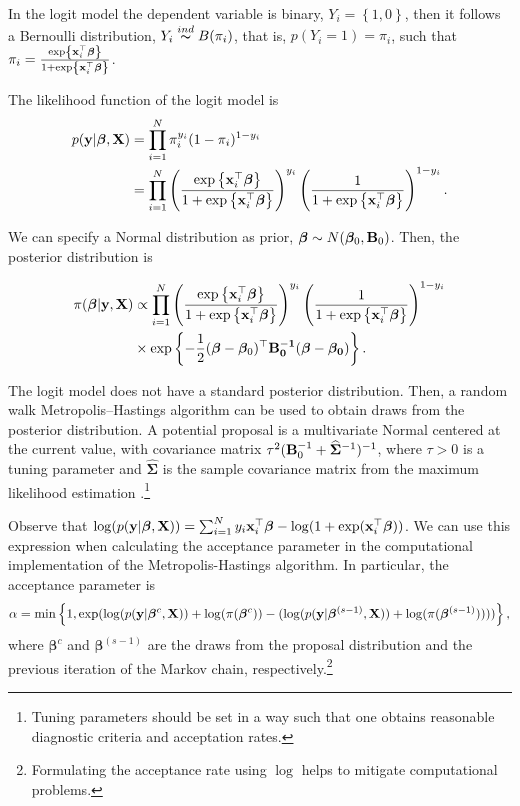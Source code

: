 In the logit model the dependent variable is binary, $Y_i=\left\{1,0\right\}$, then it follows a Bernoulli distribution, $Y_i\stackrel{ind} {\thicksim}B(\pi_i)$, that is, $p(Y_i=1)=\pi_i$, such that $\pi_i=\frac{\exp\left\{{\bf{x}}_i^{\top}\bm{\beta}\right\}}{1+\exp\left\{{\bf{x}}_i^{\top}\bm{\beta}\right\}}$.

The likelihood function of the logit model is
\begin{align*}
	p({\bf{y}}|\bm{\beta},{\bf{X}})&=\prod_{i=1}^N \pi_i^{y_i}(1-\pi_i)^{1-y_i}\\
	&=\prod_{i=1}^N\left(\frac{\exp\left\{{\bf{x}}_i^{\top}\bm{\beta}\right\}}{1+\exp\left\{{\bf{x}}_i^{\top}\bm{\beta}\right\}}\right)^{y_i}\left(\frac{1}{1+\exp\left\{{\bf{x}}_i^{\top}\bm{\beta}\right\}}\right)^{1-y_i}.
\end{align*}

We can specify a Normal distribution as prior, $\bm{\beta}\sim N({\bm{\beta}}_0,{\bf{B}}_0)$. Then, the posterior distribution is

\begin{align*}
	\pi(\bm{\beta}|{\bf{y}},{\bf{X}})&\propto\prod_{i=1}^N\left(\frac{\exp\left\{{\bf{x}}_i^{\top}\bm{\beta}\right\}}{1+\exp\left\{{\bf{x}}_i^{\top}\bm{\beta}\right\}}\right)^{y_i}\left(\frac{1}{1+\exp\left\{{\bf{x}}_i^{\top}\bm{\beta}\right\}}\right)^{1-y_i}\\
	&\times\exp\left\{-\frac{1}{2}(\bm{\beta}-\bm{\beta}_0)^{\top}\bf{B}_0^{-1}(\bm{\beta}-\bm{\beta}_0)\right\}.
\end{align*}

The logit model does not have a standard posterior distribution. Then, a random walk Metropolis--Hastings algorithm can be used to obtain draws from the posterior distribution. A potential proposal is a multivariate Normal centered at the current value, with covariance matrix $\tau^2({\bf{B}}_0^{-1}+\widehat{{\bm{\Sigma}}}^{-1})^{-1}$, where $\tau>0$ is a tuning parameter and $\widehat{\bm{\Sigma}}$ is the sample covariance matrix from the maximum likelihood estimation \cite{Martin2011}.\footnote{Tuning parameters should be set in a way such that one obtains reasonable diagnostic criteria and acceptation rates.}

Observe that $\log(p({\bf{y}}|\bm{\beta},{\bf{X}}))=\sum_{i=1}^Ny_i{\bf{x}}_i^{\top}\bm{\beta}-\log(1+\exp({\bf{x}}_i^{\top}\bm{\beta}))$. We can use this expression when calculating the acceptance parameter in the computational implementation of the Metropolis-Hastings algorithm. In particular, the acceptance parameter is \begin{equation*}
	\alpha=\min\left\{1, \exp(\log(p({\bf{y}}|\bm{\beta}^{c},{\bf{X}}))+\log(\pi(\bm{\beta}^c))-(\log(p({\bf{y}}|\bm{\beta}^{(s-1)},{\bf{X}}))+\log(\pi(\bm{\beta}^{(s-1)}))))\right\},
\end{equation*}
where $\bm{\beta}^c$ and $\bm{\beta}^{(s-1)}$ are the draws from the proposal distribution and the previous iteration of the Markov chain, respectively.\footnote{Formulating the acceptance rate using $\log$ helps to mitigate computational problems.}\\

